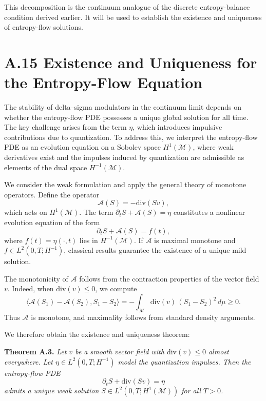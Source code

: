 This decomposition is the continuum analogue of the discrete entropy-balance condition derived earlier. It will be used to establish the existence and uniqueness of entropy-flow solutions.

\section{A.15 Existence and Uniqueness for the Entropy-Flow Equation}

The stability of delta–sigma modulators in the continuum limit depends on whether the entropy-flow PDE possesses a unique global solution for all time. The key challenge arises from the term \(\eta\), which introduces impulsive contributions due to quantization. To address this, we interpret the entropy-flow PDE as an evolution equation on a Sobolev space \(H^{1}(\mathcal{M})\), where weak derivatives exist and the impulses induced by quantization are admissible as elements of the dual space \(H^{-1}(\mathcal{M})\).

We consider the weak formulation and apply the general theory of monotone operators. Define the operator
\[
\mathcal{A}(S) = -\mathrm{div}(S v),
\]
which acts on \(H^{1}(\mathcal{M})\). The term \(\partial_t S + \mathcal{A}(S) = \eta\) constitutes a nonlinear evolution equation of the form
\[
\partial_t S + \mathcal{A}(S) = f(t),
\]
where \(f(t)=\eta(\cdot,t)\) lies in \(H^{-1}(\mathcal{M})\). If \(\mathcal{A}\) is maximal monotone and \(f\in L^2(0,T;H^{-1})\), classical results guarantee the existence of a unique mild solution.

The monotonicity of \(\mathcal{A}\) follows from the contraction properties of the vector field \(v\). Indeed, when \(\mathrm{div}(v)\leq 0\), we compute
\[
\langle \mathcal{A}(S_1) - \mathcal{A}(S_2), S_1 - S_2 \rangle
=
-\int_{\mathcal{M}} \mathrm{div}(v) \, (S_1 - S_2)^2 \, d\mu
\geq 0.
\]
Thus \(\mathcal{A}\) is monotone, and maximality follows from standard density arguments.

We therefore obtain the existence and uniqueness theorem:

\medskip

\textbf{Theorem A.3.}
\emph{Let \(v\) be a smooth vector field with \(\mathrm{div}(v)\leq 0\) almost everywhere. Let \(\eta\in L^2(0,T;H^{-1})\) model the quantization impulses. Then the entropy-flow PDE}
\[
\partial_t S + \mathrm{div}(S v) = \eta
\]
\emph{admits a unique weak solution \(S\in L^2(0,T;H^{1}(\mathcal{M}))\) for all \(T>0\).}

\medskip

